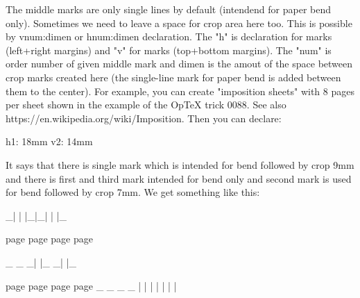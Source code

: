 The middle marks are only single lines by default (intendend for paper bend
only). Sometimes we need to leave a space for crop area here too. This is
possible by \middlecrop vnum:{dimen} or \middlecrop hnum:{dimen}
declaration. The "h" is declaration for \hmiddle marks (left+right
margins) and "v" for \vmiddle marks (top+bottom margins). The "num" is order
number of given middle mark and dimen is the amout of the space between crop
marks created here (the single-line mark for paper bend is added between
them to the center). For example, you can create "imposition sheets" with 8
pages per sheet shown in the example of the OpTeX trick 0088. See also
https://en.wikipedia.org/wiki/Imposition. Then you can declare:

    \middlecrop h1: {18mm}
    \middlecrop v2: {14mm}

It says that there is single \hmiddle mark which is intended for bend
followed by crop 9mm and there is first and third \vmiddle mark intended for
bend only and second \vmiddle mark is used for bend followed by crop 7mm.
We get something like this:

    _|      |      |_|_|      |      |_

       page   page       page   page

    _                                 _
    _|                               |_
    _|                               |_


       page   page       page   page
    _               _ _               _
     |      |      | | |      |      |



